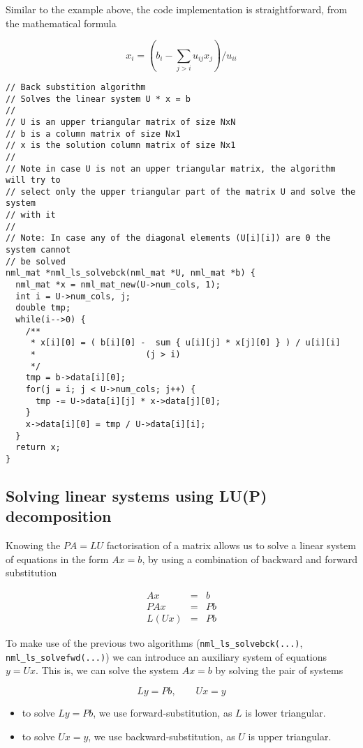 Similar to the example above, the code implementation is straightforward, from the mathematical formula

$$
x_i = \left( b_i - \sum_{j>i} u_{ij}x_j \right) / u_{ii}
$$

\begin{verbatim}
// Back substition algorithm
// Solves the linear system U * x = b
//
// U is an upper triangular matrix of size NxN
// b is a column matrix of size Nx1
// x is the solution column matrix of size Nx1
//
// Note in case U is not an upper triangular matrix, the algorithm will try to
// select only the upper triangular part of the matrix U and solve the system
// with it
//
// Note: In case any of the diagonal elements (U[i][i]) are 0 the system cannot
// be solved
nml_mat *nml_ls_solvebck(nml_mat *U, nml_mat *b) {
  nml_mat *x = nml_mat_new(U->num_cols, 1);
  int i = U->num_cols, j;
  double tmp;
  while(i-->0) {
    /**
     * x[i][0] = ( b[i][0] -  sum { u[i][j] * x[j][0] } ) / u[i][i]
     *                      (j > i)
     */
    tmp = b->data[i][0];
    for(j = i; j < U->num_cols; j++) {
      tmp -= U->data[i][j] * x->data[j][0];
    }
    x->data[i][0] = tmp / U->data[i][i];
  }
  return x;
}
\end{verbatim}

\subsection{Solving linear systems using LU(P) decomposition}

Knowing the $PA=LU$ factorisation of a matrix allows us to solve a linear system of equations in the form $Ax=b$, by using a combination of backward and forward substitution

\begin{eqnarray}
\nonumber Ax & = & b \\
\nonumber PAx & = & Pb \\
\nonumber L(Ux) & = & Pb
\end{eqnarray}

To make use of the previous two algorithms ({\tt nml\_ls\_solvebck(...)}, {\tt nml\_ls\_solvefwd(...)}) we can introduce an auxiliary system of equations $y=Ux$. This is, we can solve the system $Ax=b$ by solving the pair of systems

$$
Ly = Pb, \qquad Ux = y
$$

\begin{itemize}
\item to solve $Ly = Pb$, we use forward-substitution, as $L$ is lower triangular.
\item to solve $Ux = y$, we use backward-substitution, as $U$ is upper triangular.
\end{itemize}

